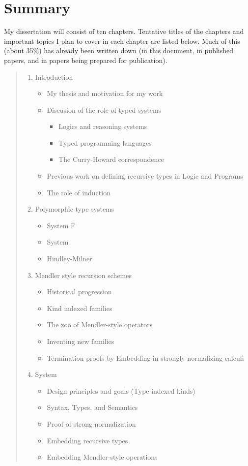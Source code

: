 \section{Summary}\label{sec:summary}
My dissertation will consist of ten chapters.
Tentative titles of the chapters and important topics I plan to cover in each
chapter are listed below. Much of this (about 35\%) has already been written down
(in this document, in published papers, and in papers being prepared
for publication). 
\begin{quote}
\begin{enumerate}[1.]
\item Introduction
\begin{itemize}
\item My thesis and motivation for my work
\item Discusion of the role of typed systems
   \begin{itemize}
     \item Logics and reasoning systems
     \item Typed programming languages
     \item The Curry-Howard correspondence
   \end{itemize}
\item Previous work on defining recursive types in Logic and Programs
\item The role of induction
\end{itemize}

\item Polymorphic type systems 
 \begin{itemize}
     \item System \textsf{F}
     \item System \Fw
     \item Hindley-Milner
 \end{itemize}
 
\item Mendler style recursion schemes
  \begin{itemize}
     \item Historical progression
     \item Kind indexed families
     \item The zoo of Mendler-style operators
     \item Inventing new families
     \item Termination proofs by Embedding in strongly normalizing calculi
  \end{itemize}

\item System \Fi
  \begin{itemize}
     \item Design principles and goals (Type indexed kinds)
     \item Syntax, Types, and Semantics
     \item Proof of strong normalization
     \item Embedding recursive types
     \item Embedding Mendler-style operations
  \end{itemize}
  

\end{enumerate}
\end{quote}
